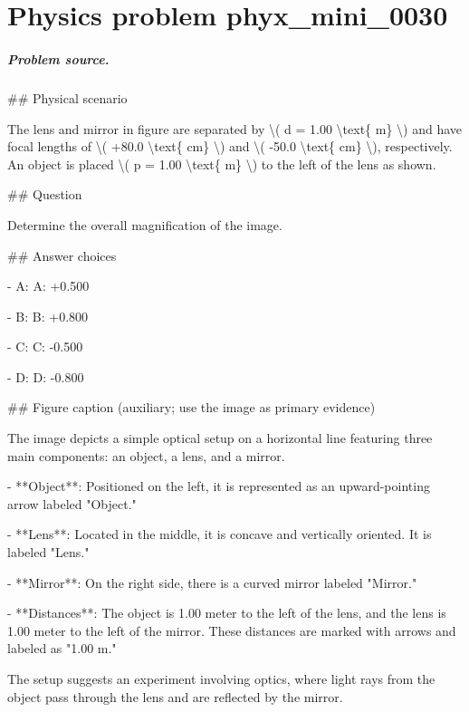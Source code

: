 
\chapter{Physics problem phyx\_mini\_0030}
\label{ch:PhyXMiniProblems_problem_phyx_mini_0030}

\paragraph{Problem source.}
\#\# Physical scenario

The lens and mirror in figure are separated by \textbackslash{}( d = 1.00 \textbackslash{}text\{ m\} \textbackslash{}) and have focal lengths of \textbackslash{}( +80.0 \textbackslash{}text\{ cm\} \textbackslash{}) and \textbackslash{}( -50.0 \textbackslash{}text\{ cm\} \textbackslash{}), respectively. An object is placed \textbackslash{}( p = 1.00 \textbackslash{}text\{ m\} \textbackslash{}) to the left of the lens as shown.

\#\# Question

Determine the overall magnification of the image.

\#\# Answer choices

- A: A: +0.500

- B: B: +0.800

- C: C: -0.500

- D: D: -0.800

\#\# Figure caption (auxiliary; use the image as primary evidence)

The image depicts a simple optical setup on a horizontal line featuring three main components: an object, a lens, and a mirror.

- **Object**: Positioned on the left, it is represented as an upward-pointing arrow labeled "Object."

- **Lens**: Located in the middle, it is concave and vertically oriented. It is labeled "Lens."

- **Mirror**: On the right side, there is a curved mirror labeled "Mirror."

- **Distances**: The object is 1.00 meter to the left of the lens, and the lens is 1.00 meter to the left of the mirror. These distances are marked with arrows and labeled as "1.00 m."

The setup suggests an experiment involving optics, where light rays from the object pass through the lens and are reflected by the mirror.

